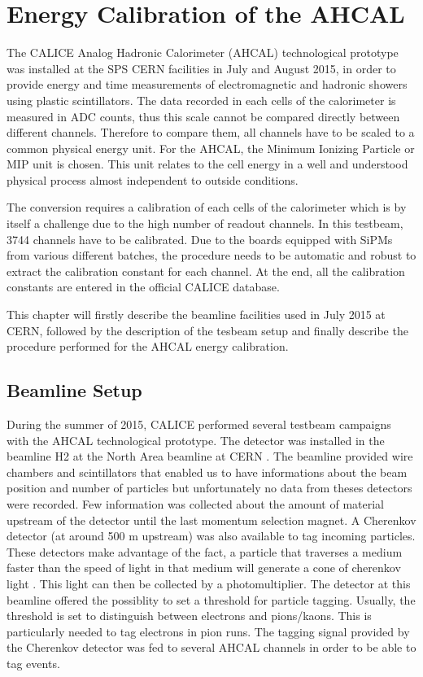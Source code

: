 \chapter{Energy Calibration of the AHCAL}
\label{chap:ECalibAHCAL}

The CALICE Analog Hadronic Calorimeter (AHCAL) technological prototype was installed at the SPS CERN facilities in July and August 2015, in order to provide energy and time measurements of electromagnetic and hadronic showers using plastic scintillators. The data recorded in each cells of the calorimeter is measured in ADC counts, thus this scale cannot be compared directly between different channels. Therefore to compare them, all channels have to be scaled to a common physical energy unit. For the AHCAL, the Minimum Ionizing Particle or MIP unit is chosen. This unit relates to the cell energy in a well and understood physical process almost independent to outside conditions.

The conversion requires a calibration of each cells of the calorimeter which is by itself a challenge due to the high number of readout channels. In this testbeam, 3744 channels have to be calibrated. Due to the boards equipped with SiPMs from various different batches, the procedure needs to be automatic and robust to extract the calibration constant for each channel. At the end, all the calibration constants are entered in the official CALICE database.

This chapter will firstly describe the beamline facilities used in July 2015 at CERN, followed by the description of the tesbeam setup and finally describe the procedure performed for the AHCAL energy calibration.

\section{Beamline Setup}
\label{sec:beamline}

During the summer of 2015, CALICE performed several testbeam campaigns with the AHCAL technological prototype. The detector was installed in the beamline H2 at the North Area beamline at CERN \cite{H2Beamline}. The beamline provided wire chambers and scintillators that enabled us to have informations about the beam position and number of particles but unfortunately no data from theses detectors were recorded. Few information was collected about the amount of material upstream of the detector until the last momentum selection magnet. A Cherenkov detector (at around 500 m upstream) was also available to tag incoming particles. These detectors make advantage of the fact, a particle that traverses a medium faster than the speed of light in that medium will generate a cone of cherenkov light \cite{}. This light can then be collected by a photomultiplier. The detector at this beamline offered the possiblity to set a threshold for particle tagging. Usually, the threshold is set to distinguish between electrons and pions/kaons. This is particularly needed to tag electrons in pion runs. The tagging signal provided by the Cherenkov detector was fed to several AHCAL channels in order to be able to tag events.\\


